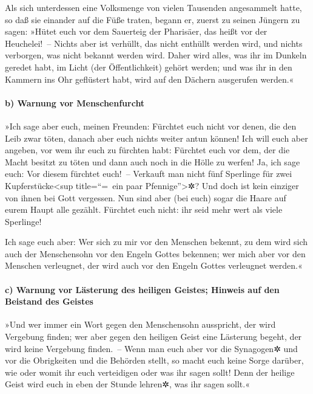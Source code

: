  Als sich unterdessen eine Volksmenge von vielen Tausenden
angesammelt hatte, so daß sie einander auf die Füße traten, begann er,
zuerst zu seinen Jüngern zu sagen: »Hütet euch vor dem Sauerteig der
Pharisäer, das heißt vor der Heuchelei!~--  Nichts aber
ist verhüllt, das nicht enthüllt werden wird, und nichts verborgen, was
nicht bekannt werden wird.  Daher wird alles, was ihr im
Dunkeln geredet habt, im Licht (der Öffentlichkeit) gehört werden; und
was ihr in den Kammern ins Ohr geflüstert habt, wird auf den Dächern
ausgerufen werden.«

\hypertarget{b-warnung-vor-menschenfurcht}{%
\paragraph{b) Warnung vor
Menschenfurcht}\label{b-warnung-vor-menschenfurcht}}

 »Ich sage aber euch, meinen Freunden: Fürchtet euch nicht
vor denen, die den Leib zwar töten, danach aber euch nichts weiter antun
können!  Ich will euch aber angeben, vor wem ihr euch zu
fürchten habt: Fürchtet euch vor dem, der die Macht besitzt zu töten und
dann auch noch in die Hölle zu werfen! Ja, ich sage euch: Vor diesem
fürchtet euch!~--  Verkauft man nicht fünf Sperlinge für
zwei Kupferstücke\textless sup title=``=~ein paar
Pfennige''\textgreater✲? Und doch ist kein einziger von ihnen bei Gott
vergessen.  Nun sind aber (bei euch) sogar die Haare auf
eurem Haupt alle gezählt. Fürchtet euch nicht: ihr seid mehr wert als
viele Sperlinge!

 Ich sage euch aber: Wer sich zu mir vor den Menschen
bekennt, zu dem wird sich auch der Menschensohn vor den Engeln Gottes
bekennen;  wer mich aber vor den Menschen verleugnet, der
wird auch vor den Engeln Gottes verleugnet werden.«

\hypertarget{c-warnung-vor-luxe4sterung-des-heiligen-geistes-hinweis-auf-den-beistand-des-geistes}{%
\paragraph{c) Warnung vor Lästerung des heiligen Geistes; Hinweis auf
den Beistand des
Geistes}\label{c-warnung-vor-luxe4sterung-des-heiligen-geistes-hinweis-auf-den-beistand-des-geistes}}

 »Und wer immer ein Wort gegen den Menschensohn
ausspricht, der wird Vergebung finden; wer aber gegen den heiligen Geist
eine Lästerung begeht, der wird keine Vergebung finden.~--
 Wenn man euch aber vor die Synagogen✲ und vor die
Obrigkeiten und die Behörden stellt, so macht euch keine Sorge darüber,
wie oder womit ihr euch verteidigen oder was ihr sagen sollt!
 Denn der heilige Geist wird euch in eben der Stunde
lehren✲, was ihr sagen sollt.«

